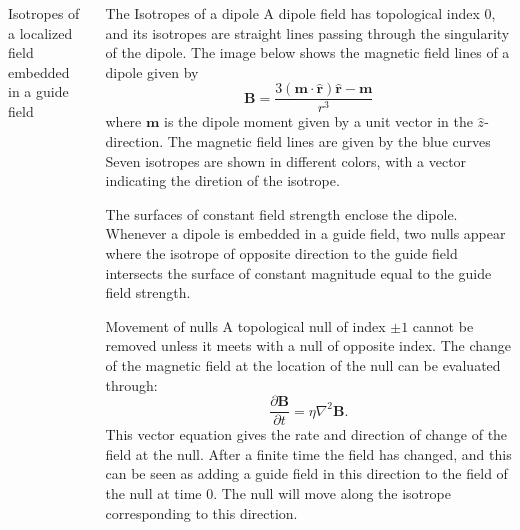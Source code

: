 \documentclass[final]{beamer}
\newlength{\onecolwid}
\begin{document}
\begin{frame}[t]
\begin{columns}[t]
\begin{column}{\onecolwid}
\begin{block}{Isotropes of a localized field embedded in a guide field}
\end{block}
\end{column} 
\begin{column}{\onecolwid} %
  
\begin{block}{The Isotropes of a dipole}
    A dipole field has topological index 0, and its isotropes are straight lines passing through
	the singularity of the dipole. 
	The image below shows the magnetic field lines of a dipole given by
	\begin{equation}
		\mathbf{B} = \frac{3(\mathbf{m}\cdot\hat{\mathbf{r}})\hat{\mathbf{r}}-\mathbf{m}}
		{r^3}
	\end{equation}
	where $\mathbf{m}$ is the dipole moment given by a unit vector in the
	$\hat{z}$-direction. 
	The magnetic field lines are given by the blue curves
	Seven isotropes are shown in different colors, with a vector indicating the diretion of the
	isotrope. 
    \begin{figure}
    \end{figure}
	The surfaces of constant field strength enclose the dipole. 
	Whenever a dipole is embedded in a guide field, two nulls appear where the isotrope of
	opposite direction to the guide field intersects the surface of constant magnitude
	equal to the guide field strength. 
\end{block}


\begin{block}{Movement of nulls}
    A topological null of index $\pm 1$ cannot be removed unless it meets with a null of opposite index. 
    The change of the magnetic field at the location of the null can be evaluated through:
    \begin{equation}
        \frac{\partial \mathbf{B}}{\partial t} = \eta \nabla^2 \mathbf{B}.
    \end{equation}
    This vector equation gives the rate and direction of change of the field at the null.
    After a finite time the field has changed, and this can be seen as adding a guide
    field in this direction to the field of the null at time 0. 
    The null will move along the isotrope corresponding to this direction.


\end{block}
\end{column}
\end{columns}
\end{frame}
\end{document}
